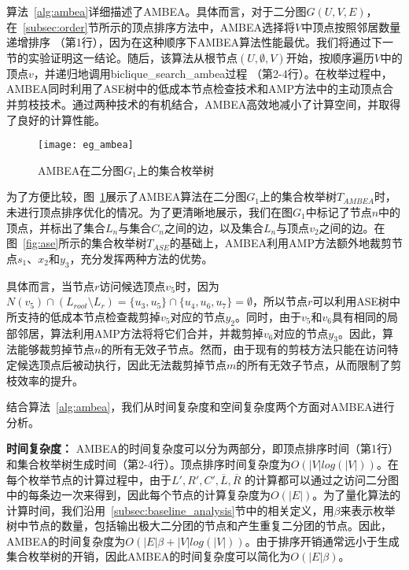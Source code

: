 算法~\ref{alg:ambea}详细描述了AMBEA。具体而言，对于二分图$G(U,V,E)$，在~\ref{subsec:order}节所示的顶点排序方法中，AMBEA选择将$V$中顶点按照邻居数量递增排序 （第1行），因为在这种顺序下AMBEA算法性能最优。我们将通过下一节的实验证明这一结论。随后，该算法从根节点$(U,\emptyset,V)$开始，按顺序遍历$V$中的顶点$v$，并递归地调用\textsf{biclique\_search\_ambea}过程 （第2-4行）。在枚举过程中，AMBEA同时利用了ASE树中的低成本节点检查技术和AMP方法中的主动顶点合并剪枝技术。通过两种技术的有机结合，AMBEA高效地减小了计算空间，并取得了良好的计算性能。

\begin{figure} [H]
	\centering
	
  \texttt{[image: eg\_ambea]}

	\caption{AMBEA在二分图$G_1$上的集合枚举树}
	\label{fig:ambea}
\end{figure}

\begin{example}
  \label{example:ambea}
  为了方便比较，图~\ref{fig:ambea}展示了AMBEA算法在二分图$G_1$上的集合枚举树$T_{AMBEA}$时，未进行顶点排序优化的情况。为了更清晰地展示，我们在图$G_1$中标记了节点$n$中的顶点，并标出了集合$L_n$与集合$C_n$之间的边，以及集合$L_n$与顶点$v_2$之间的边。在图~\ref{fig:ase}所示的集合枚举树$T_{ASE}$的基础上，AMBEA利用AMP方法额外地裁剪节点$s_1$、$x_2$和$y_3$，充分发挥两种方法的优势。

  具体而言，当节点$r$访问候选顶点$v_5$时，因为$N(v_5) \cap (L_{root} \setminus L_r) = \{u_3, u_5\} \cap \{u_4, u_6, u_7\} = \emptyset$，所以节点$r$可以利用ASE树中所支持的低成本节点检查裁剪掉$v_5$对应的节点$y_2$。同时，由于$v_5$和$v_6$具有相同的局部邻居，算法利用AMP方法将将它们合并，并裁剪掉$v_6$对应的节点$y_3$。因此，算法能够裁剪掉节点$n$的所有无效子节点。然而，由于现有的剪枝方法只能在访问特定候选顶点后被动执行，因此无法裁剪掉节点$m$的所有无效子节点，从而限制了剪枝效率的提升。
\end{example}

结合算法~\ref{alg:ambea}，我们从时间复杂度和空间复杂度两个方面对AMBEA进行分析。

\textbf{时间复杂度：} AMBEA的时间复杂度可以分为两部分，即顶点排序时间（第1行）和集合枚举树生成时间（第2-4行）。顶点排序时间复杂度为$O(|V|log(|V|))$。在每个枚举节点的计算过程中，由于$L', R', C',\overline{L},\overline{R}$ 的计算都可以通过之访问二分图中的每条边一次来得到，因此每个节点的计算复杂度为$O(|E|)$。为了量化算法的计算时间，我们沿用~\ref{subsec:baseline_analysis}节中的相关定义，用$\beta$来表示枚举树中节点的数量，包括输出极大二分团的节点和产生重复二分团的节点。因此，AMBEA的时间复杂度为$O(|E|\beta + |V|log(|V|))$。由于排序开销通常远小于生成集合枚举树的开销，因此AMBEA的时间复杂度可以简化为$O(|E|\beta)$。

